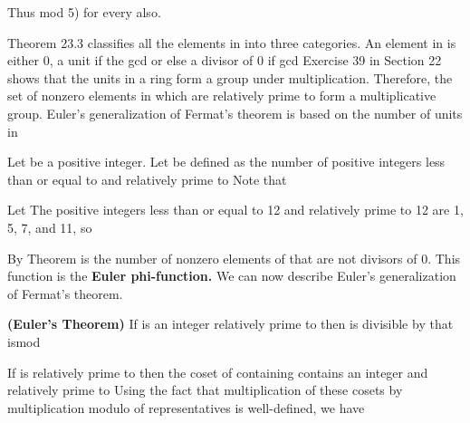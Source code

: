 \documentclass[11pt,oneside]{article}
\begin{document}
\begin{BookBody}
\noindent Thus mod 5) for every  also. \BookEnd{\blacktriangle}


\noindent Theorem 23.3 classifies all the elements in  into three categories. An element  in  is either 0, a unit if the gcd or else a divisor of 0 if gcd Exercise 39 in Section 22 shows that the units in a ring form a group under multiplication. Therefore, the set of nonzero elements in  which are relatively prime to  form a multiplicative group. Euler’s generalization of Fermat’s theorem is based on the number of units in 

Let  be a positive integer. Let  be defined as the number of positive integers less than or equal to  and relatively prime to  Note that 

 Let  The positive integers less than or equal to 12 and relatively prime to 12 are 1, 5, 7, and 11, so \BookEnd{\blacktriangle}

By Theorem  is the number of nonzero elements of  that are not divisors of 0. This function  is the\textbf{ Euler phi-function.} We can now describe Euler’s generalization of Fermat’s theorem.

 \textbf{(Euler’s Theorem)} If  is an integer relatively prime to  then  is divisible by  that ismod 

 If  is relatively prime to  then the coset  of  containing  contains an integer  and relatively prime to  Using the fact that multiplication of these cosets by multiplication modulo  of representatives is well-defined, we have


\end{BookBody}
\end{document}
